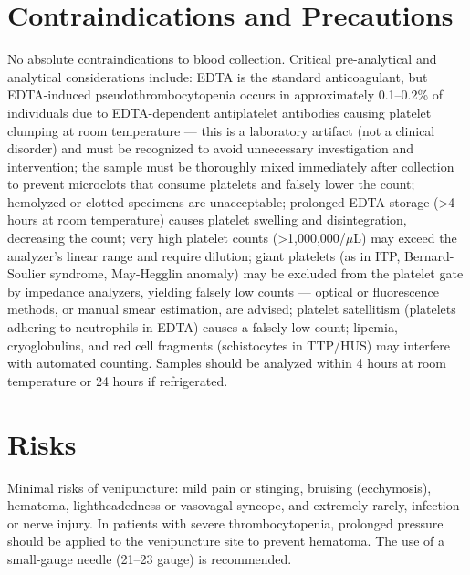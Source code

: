 \section*{Contraindications and Precautions}
No absolute contraindications to blood collection. Critical pre-analytical and analytical considerations include: EDTA is the standard anticoagulant, but EDTA-induced pseudothrombocytopenia occurs in approximately 0.1--0.2\% of individuals due to EDTA-dependent antiplatelet antibodies causing platelet clumping at room temperature --- this is a laboratory artifact (not a clinical disorder) and must be recognized to avoid unnecessary investigation and intervention; the sample must be thoroughly mixed immediately after collection to prevent microclots that consume platelets and falsely lower the count; hemolyzed or clotted specimens are unacceptable; prolonged EDTA storage (>4 hours at room temperature) causes platelet swelling and disintegration, decreasing the count; very high platelet counts (>1,000,000/$\mu$L) may exceed the analyzer's linear range and require dilution; giant platelets (as in ITP, Bernard-Soulier syndrome, May-Hegglin anomaly) may be excluded from the platelet gate by impedance analyzers, yielding falsely low counts --- optical or fluorescence methods, or manual smear estimation, are advised; platelet satellitism (platelets adhering to neutrophils in EDTA) causes a falsely low count; lipemia, cryoglobulins, and red cell fragments (schistocytes in TTP/HUS) may interfere with automated counting. Samples should be analyzed within 4 hours at room temperature or 24 hours if refrigerated.

\section*{Risks}
Minimal risks of venipuncture: mild pain or stinging, bruising (ecchymosis), hematoma, lightheadedness or vasovagal syncope, and extremely rarely, infection or nerve injury. In patients with severe thrombocytopenia, prolonged pressure should be applied to the venipuncture site to prevent hematoma. The use of a small-gauge needle (21--23 gauge) is recommended.

